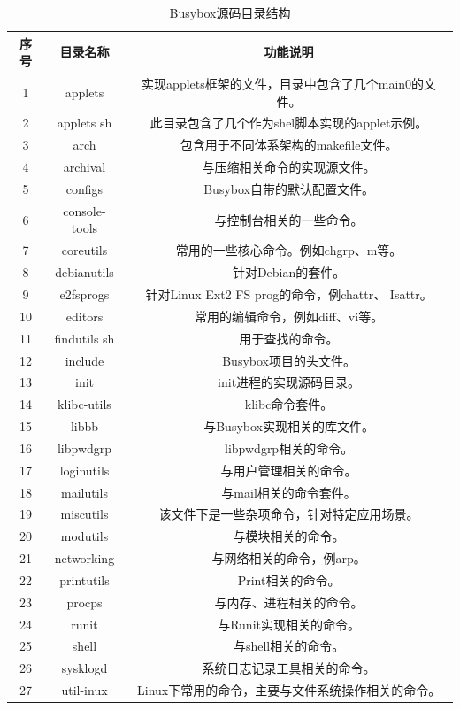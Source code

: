 \begin{table}[h!]
	\begin{center}
		\caption{Busybox源码目录结构}
		\begin{tabular}{c|c|c} %
			\textbf{序号} & \textbf{目录名称} & \textbf{功能说明}\\
			\hline
			1 & applets & 实现applets框架的文件，目录中包含了几个main0的文件。\\
			2 & applets sh & 此目录包含了几个作为shel脚本实现的applet示例。\\
			3 & arch & 包含用于不同体系架构的makefile文件。\\
			4 & archival & 与压缩相关命令的实现源文件。\\
			5 & configs & Busybox自带的默认配置文件。\\
			6 & console-tools & 与控制台相关的一些命令。\\
			7 & coreutils & 常用的一些核心命令。例如chgrp、m等。\\
			8 & debianutils & 针对Debian的套件。\\
			9 & e2fsprogs & 针对Linux Ext2 FS prog的命令，例chattr、 Isattr。\\
			10 & editors & 常用的编辑命令，例如diff、vi等。\\
			11 & findutils sh & 用于查找的命令。\\
			12 & include & Busybox项目的头文件。\\
			13 & init & init进程的实现源码目录。\\
			14 & klibc-utils & klibc命令套件。\\
			15 & libbb & 与Busybox实现相关的库文件。\\
			16 & libpwdgrp & libpwdgrp相关的命令。\\
			17 & loginutils & 与用户管理相关的命令。\\
			18 & mailutils & 与mail相关的命令套件。\\
			19 & miscutils & 该文件下是一些杂项命令，针对特定应用场景。\\
			20 & modutils & 与模块相关的命令。\\
			21 & networking & 与网络相关的命令，例arp。\\
			22 & printutils & Print相关的命令。\\
			23 & procps & 与内存、进程相关的命令。\\
			24 & runit & 与Runit实现相关的命令。\\
			25 & shell & 与shell相关的命令。\\
			26 & sysklogd & 系统日志记录工具相关的命令。\\
			27 & util-inux & Linux下常用的命令，主要与文件系统操作相关的命令。\\
		\end{tabular}
	\end{center}
\end{table}


